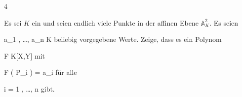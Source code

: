 {4}
{





Es sei $K$ ein
und seien
 endlich viele Punkte in der affinen Ebene ${\mathbb A}^{2}_{ K }$. Es seien

\mavergleichskette
{\vergleichskette
{ a_1 , \ldots , a_n
}
{ \in }{ K
}
{  }{
}
{    }{
}
{   }{
}
}
{}{}{}
beliebig vorgegebene Werte. Zeige, dass es ein Polynom

\mavergleichskette
{\vergleichskette
{ F
}
{ \in }{ K[X,Y]
}
{  }{
}
{    }{
}
{   }{
}
}
{}{}{}
mit

\mavergleichskette
{\vergleichskette
{ F \left(  P_i  \right)
}
{ = }{ a_i
}
{  }{
}
{    }{
}
{   }{
}
}
{}{}{}
für alle

\mavergleichskette
{\vergleichskette
{ i
}
{ = }{ 1 , \ldots , n
}
{  }{
}
{    }{
}
{   }{
}
}
{}{}{}
gibt.





}
{} {}
